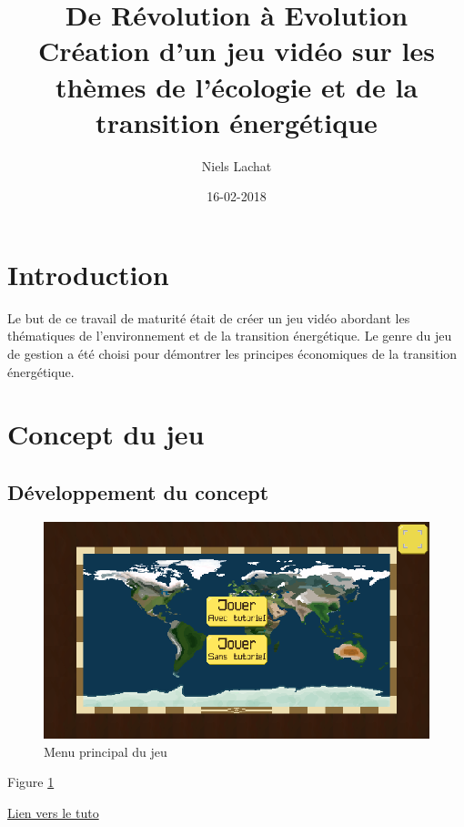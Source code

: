 \documentclass{article}
\title{De Révolution à Evolution \\ Création d'un jeu vidéo sur les thèmes de l'écologie et de la transition énergétique}
\date{16-02-2018}
\author{Niels Lachat}
\begin{document}
        \maketitle
        \newpage

        \section{Introduction}
        Le but de ce travail de maturité était de créer un jeu vidéo abordant les thématiques de l'environnement et de la transition énergétique. Le genre du jeu de gestion a été choisi pour démontrer les principes économiques de la transition énergétique.
        
        \section{Concept du jeu}
        \subsection{Développement du concept}
        
        

        \begin{figure}[h]
                \includegraphics[width=\linewidth]{../images/mainMenu}
                \caption{Menu principal du jeu}
                \label{fig:mainMenu}
        \end{figure}

        Figure \ref{fig:mainMenu}

        \href{https://www.latex-tutorial.com/tutorials/figures/}{Lien vers le tuto}
\end{document}
